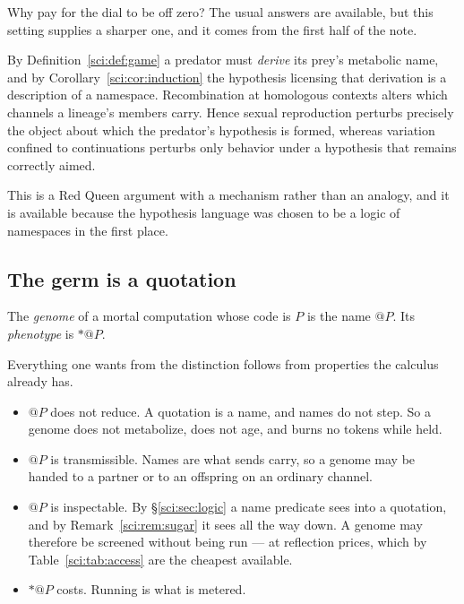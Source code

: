Why pay for the dial to be off zero? The usual answers are available, but this setting supplies a
sharper one, and it comes from the first half of the note.

\begin{proposition}
\label{sci:prop:sexdefence}
By Definition~\ref{sci:def:game} a predator must \emph{derive} its prey's metabolic name, and by
Corollary~\ref{sci:cor:induction} the hypothesis licensing that derivation is a description of a
namespace. Recombination at homologous contexts alters which channels a lineage's members carry.
Hence sexual reproduction perturbs precisely the object about which the predator's hypothesis is
formed, whereas variation confined to continuations perturbs only behavior under a hypothesis that
remains correctly aimed.
\end{proposition}

This is a Red Queen argument with a mechanism rather than an analogy, and it is available because the
hypothesis language was chosen to be a logic of namespaces in the first place.

\subsection{The germ is a quotation}\label{sci:S12.2}

\begin{definition}
\label{sci:def:genome}
The \emph{genome} of a mortal computation whose code is $P$ is the name $@P$. Its \emph{phenotype} is
$\ast @P$.
\end{definition}

Everything one wants from the distinction follows from properties the calculus already has.

\begin{itemize}
\item $@P$ does not reduce. A quotation is a name, and names do not step. So a genome does not
metabolize, does not age, and burns no tokens while held.
\item $@P$ is transmissible. Names are what sends carry, so a genome may be handed to a partner or
to an offspring on an ordinary channel.
\item $@P$ is inspectable. By \S\ref{sci:sec:logic} a name predicate sees into a quotation, and by
Remark~\ref{sci:rem:sugar} it sees all the way down. A genome may therefore be screened without being
run --- at reflection prices, which by Table~\ref{sci:tab:access} are the cheapest available.
\item $\ast @P$ costs. Running is what is metered.
\end{itemize}

